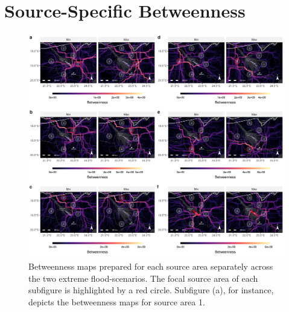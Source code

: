 \documentclass[abstract=on,10pt,a4paper,bibliography=totocnumbered]{article}
\begin{document}
\section{Source-Specific Betweenness}
\begin{figure}[htbp]
  \begin{center}
  \includegraphics[width = \textwidth]{Figures/BetweennessIndividual.png}
  \caption{Betweenness maps prepared for each source area separately across the
  two extreme flood-scenarios. The focal source area of each subfigure is
  highlighted by a red circle. Subfigure (a), for instance, depicts the
  betweenness maps for source area 1.}
  \label{Betweenness}
  \end{center}
\end{figure}

\newpage
\end{document}
